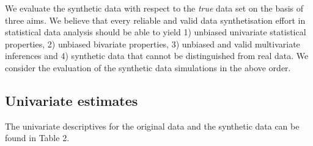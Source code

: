 \documentclass[psych,article,submit,moreauthors,pdftex]{mdpi}
\begin{document}
We evaluate the synthetic data with respect to the \emph{true} data set
on the basis of three aims. We believe that every reliable and valid
data synthetisation effort in statistical data analysis should be able
to yield 1) unbiased univariate statistical properties, 2) unbiased
bivariate properties, 3) unbiased and valid multivariate inferences and
4) synthetic data that cannot be distinguished from real data. We
consider the evaluation of the synthetic data simulations in the above
order.

\hypertarget{univariate-estimates}{%
\subsection{Univariate estimates}\label{univariate-estimates}}

The univariate descriptives for the original data and the synthetic data
can be found in Table 2.
\end{document}
